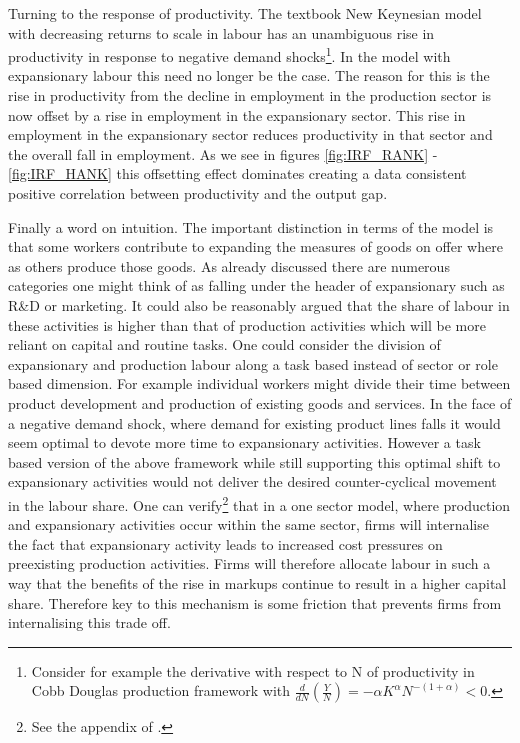 \documentclass[12pt]{article}
\begin{document}
Turning to the response of productivity. The textbook New Keynesian model  with decreasing returns to scale in labour has an unambiguous rise in productivity in response to negative demand shocks\footnote{Consider for example the derivative with respect to N of productivity in Cobb Douglas production framework with $\frac{d}{dN} \left(\frac{Y}{N}\right) =-\alpha K^{\alpha}N^{-(1+\alpha)} <0$.}. In the model with expansionary labour this need no longer be the case. The reason for this is the rise in productivity from the decline in employment in the production sector is now offset by a rise in employment in the expansionary sector. This rise in employment in the expansionary sector reduces productivity in that sector and the overall fall in employment. As we see in figures \ref{fig:IRF_RANK} - \ref{fig:IRF_HANK}  this offsetting effect dominates creating a data consistent positive correlation between productivity and the output gap. 

Finally a word on intuition. The important distinction in terms of the model is that some workers contribute to expanding the measures of goods on offer where as others produce those goods. As already discussed there are numerous categories one might think of as falling under the header of expansionary such as R\&D or marketing. It could also be reasonably argued that the share of labour in these activities is higher than that of production activities which will be more reliant on capital and routine tasks.
One could consider the division of expansionary and production labour along a task based instead of sector or role based dimension. For example individual workers might divide their time between product development and production of existing goods and services. In the face of a negative demand shock, where demand for existing product lines falls it would seem optimal to devote more time to expansionary activities. However a task based version of the above framework while still supporting this optimal shift to expansionary activities would not deliver the desired counter-cyclical movement in the labour share. One can verify\footnote{See the appendix of \cite{kaplan2020markups}.} that in a one sector model, where production and expansionary activities occur within the same sector, firms will internalise the fact that expansionary activity leads to increased cost pressures on preexisting production activities. Firms will therefore allocate labour in such a way that the benefits of the rise in markups continue to result in a higher capital share. Therefore key to this mechanism is some friction that prevents firms from internalising this trade off.  
\end{document}
